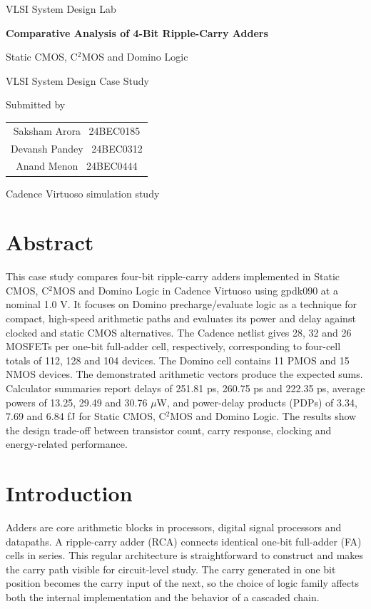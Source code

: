 \documentclass[11pt,a4paper]{article}
\newcommand{\StudentList}{\begin{tabular}{c}Saksham Arora \textbar\ 24BEC0185\\[2pt]Devansh Pandey \textbar\ 24BEC0312\\[2pt]Anand Menon \textbar\ 24BEC0444\end{tabular}}
\begin{document}
\begin{titlepage}
\centering
\vspace*{15mm}
{\Large VLSI System Design Lab\par}
\vspace{12mm}
{\huge\bfseries Comparative Analysis of 4-Bit Ripple-Carry Adders\par}
\vspace{4mm}
{\LARGE Static CMOS, C$^{2}$MOS and Domino Logic\par}
\vspace{14mm}
{\Large VLSI System Design Case Study\par}
\vspace{16mm}
{\large Submitted by\par}
\vspace{4mm}
{\large \StudentList\par}
\vfill
{\large Cadence Virtuoso simulation study\par}
\end{titlepage}
\section*{Abstract}
This case study compares four-bit ripple-carry adders implemented in Static CMOS, C$^{2}$MOS and Domino Logic in Cadence Virtuoso using gpdk090 at a nominal 1.0 V. It focuses on Domino precharge/evaluate logic as a technique for compact, high-speed arithmetic paths and evaluates its power and delay against clocked and static CMOS alternatives. The Cadence netlist gives 28, 32 and 26 MOSFETs per one-bit full-adder cell, respectively, corresponding to four-cell totals of 112, 128 and 104 devices. The Domino cell contains 11 PMOS and 15 NMOS devices. The demonstrated arithmetic vectors produce the expected sums. Calculator summaries report delays of 251.81 ps, 260.75 ps and 222.35 ps, average powers of 13.25, 29.49 and 30.76 $\mu$W, and power-delay products (PDPs) of 3.34, 7.69 and 6.84 fJ for Static CMOS, C$^{2}$MOS and Domino Logic. The results show the design trade-off between transistor count, carry response, clocking and energy-related performance.

\section{Introduction}
Adders are core arithmetic blocks in processors, digital signal processors and datapaths. A ripple-carry adder (RCA) connects identical one-bit full-adder (FA) cells in series. This regular architecture is straightforward to construct and makes the carry path visible for circuit-level study. The carry generated in one bit position becomes the carry input of the next, so the choice of logic family affects both the internal implementation and the behavior of a cascaded chain.
\end{document}
